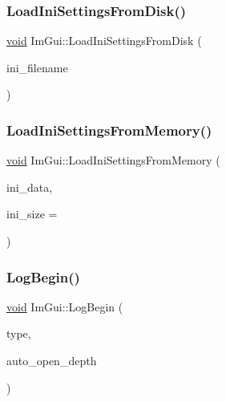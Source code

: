 \subsubsection{\texorpdfstring{Load\+Ini\+Settings\+From\+Disk()}{LoadIniSettingsFromDisk()}}
{\footnotesize\ttfamily \hyperlink{imgui__impl__opengl3__loader_8h_ac668e7cffd9e2e9cfee428b9b2f34fa7}{void} Im\+Gui\+::\+Load\+Ini\+Settings\+From\+Disk (\begin{DoxyParamCaption}\item[{const char $\ast$}]{ini\+\_\+filename }\end{DoxyParamCaption})}

\mbox{\label{namespaceImGui_a8e37b6a0b2feb6cd6ac61a4259392861}} 
\subsubsection{\texorpdfstring{Load\+Ini\+Settings\+From\+Memory()}{LoadIniSettingsFromMemory()}}
{\footnotesize\ttfamily \hyperlink{imgui__impl__opengl3__loader_8h_ac668e7cffd9e2e9cfee428b9b2f34fa7}{void} Im\+Gui\+::\+Load\+Ini\+Settings\+From\+Memory (\begin{DoxyParamCaption}\item[{const char $\ast$}]{ini\+\_\+data,  }\item[{size\+\_\+t}]{ini\+\_\+size = {} }\end{DoxyParamCaption})}

\mbox{\label{namespaceImGui_a8d053d2fd46539c5ca83550845e4cecd}} 
\subsubsection{\texorpdfstring{Log\+Begin()}{LogBegin()}}
{\footnotesize\ttfamily \hyperlink{imgui__impl__opengl3__loader_8h_ac668e7cffd9e2e9cfee428b9b2f34fa7}{void} Im\+Gui\+::\+Log\+Begin (\begin{DoxyParamCaption}\item[{\hyperlink{imgui__internal_8h_ac65915203eef19cd87f2ff1cde435c1e}{Im\+Gui\+Log\+Type}}]{type,  }\item[{int}]{auto\+\_\+open\+\_\+depth }\end{DoxyParamCaption})}

